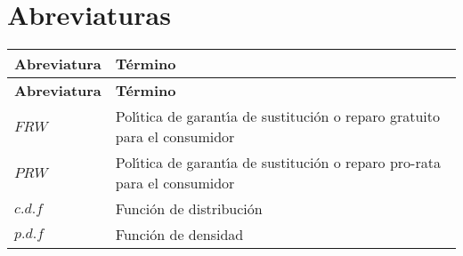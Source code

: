 


\newpage

\section*{Abreviaturas} \label{abreviaturas}
\renewcommand{\arraystretch}{1.4}

\begin{longtable}[l]{>{}l<{}l}
\textbf{Abreviatura} & \textbf{T\'{e}rmino} \\ [0.5ex] \hline
\endfirsthead
\textbf{Abreviatura} & \textbf{T\'{e}rmino} \\ [0.5ex] \hline
\endhead
$FRW$ & Pol\'{\i}tica de garant\'{\i}a de sustituci\'{o}n o reparo gratuito para el consumidor \\
$PRW$ & Pol\'{\i}tica de garant\'{\i}a de sustituci\'{o}n o reparo pro-rata para el consumidor \\
$c.d.f$ & Funci\'{o}n de distribuci\'{o}n \\
$p.d.f$ & Funci\'{o}n de densidad \\
\end{longtable}

\setlength{\extrarowheight}{0pt}